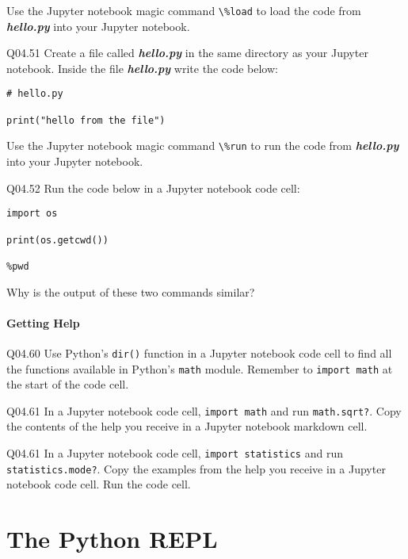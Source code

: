 \documentclass{book}
\newcommand{\passthrough}[1]{#1}
\begin{document}
Use the Jupyter notebook magic command \passthrough{\lstinline!\%load!}
to load the code from \textbf{\emph{hello.py}} into your Jupyter
notebook.

Q04.51 Create a file called \textbf{\emph{hello.py}} in the same
directory as your Jupyter notebook. Inside the file
\textbf{\emph{hello.py}} write the code below:

\begin{lstlisting}
# hello.py

print("hello from the file")
\end{lstlisting}

Use the Jupyter notebook magic command \passthrough{\lstinline!\%run!}
to run the code from \textbf{\emph{hello.py}} into your Jupyter
notebook.

Q04.52 Run the code below in a Jupyter notebook code cell:

\begin{lstlisting}
import os

print(os.getcwd())

%pwd
\end{lstlisting}

Why is the output of these two commands similar?
    




    
        \hypertarget{getting-help}{%
\subsubsection{Getting Help}\label{getting-help}}

Q04.60 Use Python's \passthrough{\lstinline!dir()!} function in a
Jupyter notebook code cell to find all the functions available in
Python's \passthrough{\lstinline!math!} module. Remember to
\passthrough{\lstinline!import math!} at the start of the code cell.

Q04.61 In a Jupyter notebook code cell,
\passthrough{\lstinline!import math!} and run
\passthrough{\lstinline!math.sqrt?!}. Copy the contents of the help you
receive in a Jupyter notebook markdown cell.

Q04.61 In a Jupyter notebook code cell,
\passthrough{\lstinline!import statistics!} and run
\passthrough{\lstinline!statistics.mode?!}. Copy the examples from the
help you receive in a Jupyter notebook code cell. Run the code cell.
    




    
        \hypertarget{the-python-repl}{%
\chapter{The Python REPL}\label{the-python-repl}}
    
\end{document}
